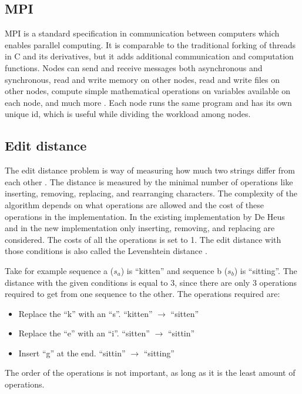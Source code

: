 \subsection{MPI}
MPI is a standard specification in communication between computers which enables parallel computing.
It is comparable to the traditional forking of threads in C and its derivatives, but it adds additional communication and computation functions.
Nodes can send and receive messages both asynchronous and synchronous, read and write memory on other nodes, read and write files on other nodes, compute simple mathematical operations on variables available on each node, and much more \cite{MPI}.
Each node runs the same program and has its own unique id, which is useful while dividing the workload among nodes.

\subsection{Edit distance}\label{bed}
The edit distance problem is way of measuring how much two strings differ from each other \cite{Navarro:2001:GTA:375360.375365}.
The distance is measured by the minimal number of operations like inserting, removing, replacing, and rearranging characters.
The complexity of the algorithm depends on what operations are allowed and the cost of these operations in the implementation.
In the existing implementation by De Heus \cite{Heus} and in the new implementation only inserting, removing, and replacing are considered.
The costs of all the operations is set to 1.
The edit distance with those conditions is also called the Levenshtein distance \cite{Navarro:2001:GTA:375360.375365}.

Take for example sequence a ($s_a$) is ``kitten'' and sequence b ($s_b$) is ``sitting''.
The distance with the given conditions is equal to 3, since there are only 3 operations required to get from one sequence to the other.
The operations required are:
\begin{itemize}
    \item Replace the ``k'' with an ``s''. ``kitten'' $\rightarrow$ ``sitten''
    \item Replace the ``e'' with an ``i''. ``sitten'' $\rightarrow$ ``sittin''
    \item Insert ``g'' at the end. ``sittin'' $\rightarrow$ ``sitting''
\end{itemize}
The order of the operations is not important, as long as it is the least amount of operations.

